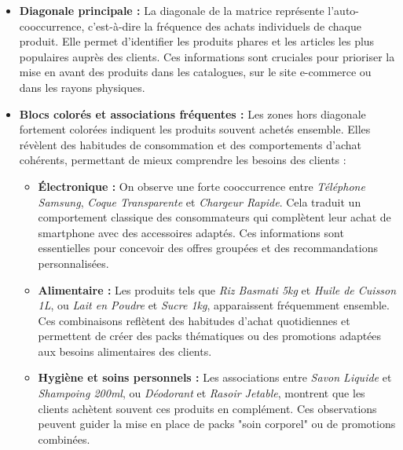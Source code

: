 \documentclass[a4paper,12pt]{article}
\begin{document}
\begin{itemize}
    \item \textbf{Diagonale principale :}  
    La diagonale de la matrice représente l'auto-cooccurrence, c'est-à-dire la fréquence des achats individuels de chaque produit. Elle permet d'identifier les produits phares et les articles les plus populaires auprès des clients. Ces informations sont cruciales pour prioriser la mise en avant des produits dans les catalogues, sur le site e-commerce ou dans les rayons physiques.  

    \item \textbf{Blocs colorés et associations fréquentes :}  
    Les zones hors diagonale fortement colorées indiquent les produits souvent achetés ensemble. Elles révèlent des habitudes de consommation et des comportements d'achat cohérents, permettant de mieux comprendre les besoins des clients :  
    \begin{itemize}
        \item \textbf{Électronique :} On observe une forte cooccurrence entre \textit{Téléphone Samsung}, \textit{Coque Transparente} et \textit{Chargeur Rapide}. Cela traduit un comportement classique des consommateurs qui complètent leur achat de smartphone avec des accessoires adaptés. Ces informations sont essentielles pour concevoir des offres groupées et des recommandations personnalisées.  
        \item \textbf{Alimentaire :} Les produits tels que \textit{Riz Basmati 5kg} et \textit{Huile de Cuisson 1L}, ou \textit{Lait en Poudre} et \textit{Sucre 1kg}, apparaissent fréquemment ensemble. Ces combinaisons reflètent des habitudes d'achat quotidiennes et permettent de créer des packs thématiques ou des promotions adaptées aux besoins alimentaires des clients.  
        \item \textbf{Hygiène et soins personnels :} Les associations entre \textit{Savon Liquide} et \textit{Shampoing 200ml}, ou \textit{Déodorant} et \textit{Rasoir Jetable}, montrent que les clients achètent souvent ces produits en complément. Ces observations peuvent guider la mise en place de packs "soin corporel" ou de promotions combinées.
    \end{itemize}


\end{itemize}
\end{document}
